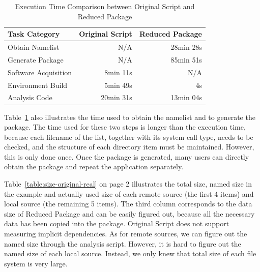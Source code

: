 \documentclass[procedia]{easychair}
\begin{document}
\begin{table}
    \centering
    \begin{tabular}{lrr}
    \hline
    \bf Task Category & \bf Original Script & \bf Reduced Package \\ \hline
    Obtain Namelist & N/A & 28min 28s \\ \hline
    Generate Package & N/A & 85min 51s \\ \hline
    Software Acquisition & 8min 11s & N/A \\ \hline
    Environment Build & 5min 49s  & 4s \\ \hline
    Analysis Code & 20min 31s & 13min 04s \\ \hline
    \end{tabular}
    \caption{Execution Time Comparison between Original Script and Reduced Package}
    \label{table:time-2nd3rd}
\end{table}    

Table~\ref{table:time-2nd3rd} also illustrates the time used to
obtain the namelist and to generate the package. 
The time used for these two steps is longer than the execution time,
because each filename of the list, together with its system call type, needs to be checked, and the structure of each directory item must be maintained.
However, 
this is only done once.
Once the package is
generated, many users can directly obtain the package and repeat the application 
separately. 

Table~\ref{table:size-original-real} on page 2 illustrates the total size, named size in the example and actually used size of each remote source (the first 4 items) and local source (the remaining 5 items).
The third column corresponds to the data size of Reduced Package and can be easily figured out, because all the necessary data has been copied into the package.
Original Script does not support measuring implicit dependencies. As for remote sources, we can figure out the named size through the analysis script. However, it is hard to figure out the named size of each local source. 
Instead, we only knew that total size of each file system is very large.
\end{document}
